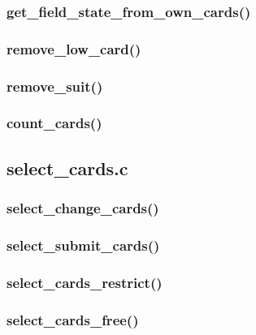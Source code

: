 \documentclass[11pt,a4paper, uplatex]{jsarticle}
\begin{document}
\subsubsection{get\_field\_state\_from\_own\_cards()}
%
\subsubsection{remove\_low\_card()}
%
\subsubsection{remove\_suit()}
%
\subsubsection{count\_cards()}
%
\subsection{select\_cards.c}
%
\subsubsection{select\_change\_cards()}
%
\subsubsection{select\_submit\_cards()}
%
\subsubsection{select\_cards\_restrict()}
%
\subsubsection{select\_cards\_free()}
\end{document}
